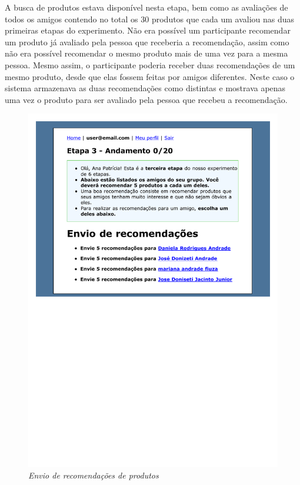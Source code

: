A busca de produtos estava disponível nesta etapa, bem como as avaliações de todos os amigos contendo no total os 30 produtos que cada um avaliou nas duas primeiras etapas do experimento. Não era possível um participante recomendar um produto já avaliado pela pessoa que receberia a recomendação, assim como não era possível recomendar o mesmo produto mais de uma vez para a mesma pessoa. Mesmo assim, o participante poderia receber duas recomendações de um mesmo produto, desde que elas fossem feitas por amigos diferentes. Neste caso o sistema armazenava as duas recomendações como distintas e mostrava apenas uma vez o produto para ser avaliado pela pessoa que recebeu a recomendação.

\begin{figure}[htp]
  \centering
  \includegraphics[width=\textwidth]{imagens/stage-3}
  \caption{\it Envio de recomendações de produtos}
  \label{fig:stage-3}
\end{figure}

